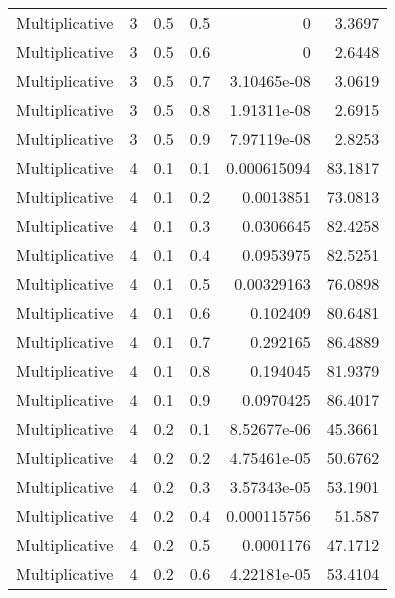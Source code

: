 \documentclass{article}
\begin{document}
\begin{longtable}[H]{lrrrrr}
 Multiplicative &       3 &   0.5 &            0.5 &      0           &          3.3697 \\
 Multiplicative &       3 &   0.5 &            0.6 &      0           &          2.6448 \\
 Multiplicative &       3 &   0.5 &            0.7 &      3.10465e-08 &          3.0619 \\
 Multiplicative &       3 &   0.5 &            0.8 &      1.91311e-08 &          2.6915 \\
 Multiplicative &       3 &   0.5 &            0.9 &      7.97119e-08 &          2.8253 \\
 Multiplicative &       4 &   0.1 &            0.1 &      0.000615094 &         83.1817 \\
 Multiplicative &       4 &   0.1 &            0.2 &      0.0013851   &         73.0813 \\
 Multiplicative &       4 &   0.1 &            0.3 &      0.0306645   &         82.4258 \\
 Multiplicative &       4 &   0.1 &            0.4 &      0.0953975   &         82.5251 \\
 Multiplicative &       4 &   0.1 &            0.5 &      0.00329163  &         76.0898 \\
 Multiplicative &       4 &   0.1 &            0.6 &      0.102409    &         80.6481 \\
 Multiplicative &       4 &   0.1 &            0.7 &      0.292165    &         86.4889 \\
 Multiplicative &       4 &   0.1 &            0.8 &      0.194045    &         81.9379 \\
 Multiplicative &       4 &   0.1 &            0.9 &      0.0970425   &         86.4017 \\
 Multiplicative &       4 &   0.2 &            0.1 &      8.52677e-06 &         45.3661 \\
 Multiplicative &       4 &   0.2 &            0.2 &      4.75461e-05 &         50.6762 \\
 Multiplicative &       4 &   0.2 &            0.3 &      3.57343e-05 &         53.1901 \\
 Multiplicative &       4 &   0.2 &            0.4 &      0.000115756 &         51.587  \\
 Multiplicative &       4 &   0.2 &            0.5 &      0.0001176   &         47.1712 \\
 Multiplicative &       4 &   0.2 &            0.6 &      4.22181e-05 &         53.4104 \\

\end{longtable}
\end{document}
